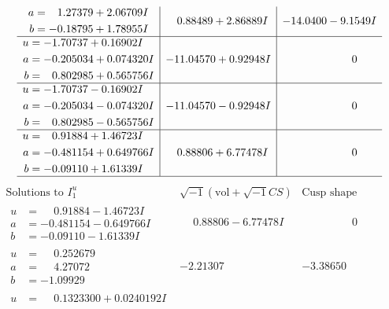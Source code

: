 \documentclass[1p]{elsarticle_modified}
\theoremstyle{definition}
\newcommand{\I}{\sqrt{-1}}
\begin{document}
$$\begin{array}{c|c|c}
\begin{aligned}
a &= \phantom{-}1.27379 + 2.06709 I \\
b &= -0.18795 + 1.78955 I\end{aligned}
 & \phantom{-}0.88489 + 2.86889 I & -14.0400 - 9.1549 I \\ \hline\begin{aligned}
u &= -1.70737 + 0.16902 I \\
a &= -0.205034 + 0.074320 I \\
b &= \phantom{-}0.802985 + 0.565756 I\end{aligned}
 & -11.04570 + 0.92948 I & \phantom{-0.000000 } 0 \\ \hline\begin{aligned}
u &= -1.70737 - 0.16902 I \\
a &= -0.205034 - 0.074320 I \\
b &= \phantom{-}0.802985 - 0.565756 I\end{aligned}
 & -11.04570 - 0.92948 I & \phantom{-0.000000 } 0 \\ \hline\begin{aligned}
u &= \phantom{-}0.91884 + 1.46723 I \\
a &= -0.481154 + 0.649766 I \\
b &= -0.09110 + 1.61339 I\end{aligned}
 & \phantom{-}0.88806 + 6.77478 I & \phantom{-0.000000 } 0\\
 \hline 
 \end{array}$$\newpage$$\begin{array}{c|c|c}  
\text{Solutions to }I^u_{1}& \I (\text{vol} + \sqrt{-1}CS) & \text{Cusp shape}\\
 \hline 
\begin{aligned}
u &= \phantom{-}0.91884 - 1.46723 I \\
a &= -0.481154 - 0.649766 I \\
b &= -0.09110 - 1.61339 I\end{aligned}
 & \phantom{-}0.88806 - 6.77478 I & \phantom{-0.000000 } 0 \\ \hline\begin{aligned}
u &= \phantom{-}0.252679\phantom{ +0.000000I} \\
a &= \phantom{-}4.27072\phantom{ +0.000000I} \\
b &= -1.09929\phantom{ +0.000000I}\end{aligned}
 & -2.21307\phantom{ +0.000000I} & -3.38650\phantom{ +0.000000I} \\ \hline\begin{aligned}
u &= \phantom{-}0.1323300 + 0.0240192 I \\

\end{aligned}
\end{array}$$
\end{document}
